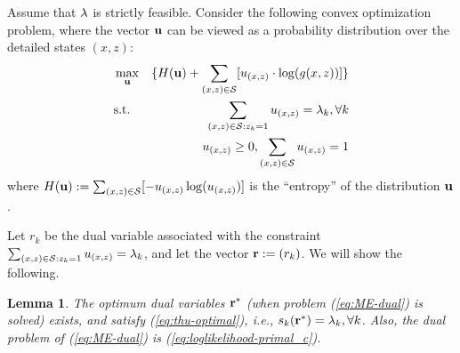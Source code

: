 \documentclass{IEEEtran}
\newtheorem{lemma}{Lemma}
\begin{document}
Assume that ${\bf \lambda}$ is strictly feasible. Consider the following
convex optimization problem, where the vector ${\bf u}$ can be viewed
as a probability distribution over the detailed states $(x,z)$:\begin{eqnarray}
 & \max_{{\bf u}} & \{H({\bf u})+\sum_{(x,z)\in{\cal S}}[u_{(x,z)}\cdot\log(g(x,z))]\}\nonumber \\
 & \text{s.t.} & \sum_{(x,z)\in{\cal S}:z_{k}=1}u_{(x,z)}=\lambda_{k},\forall k\nonumber \\
 &  & u_{(x,z)}\ge0,\sum_{(x,z)\in{\cal S}}u_{(x,z)}=1\label{eq:ME-dual}\end{eqnarray}
where $H({\bf u}):=\sum_{(x,z)\in{\cal S}}[-u_{(x,z)}\log(u_{(x,z)})]$
is the {}``entropy'' of the distribution ${\bf u}$.

Let $r_{k}$ be the dual variable associated with the constraint $\sum_{(x,z)\in{\cal S}:z_{k}=1}u_{(x,z)}=\lambda_{k}$,
and let the vector ${\bf r}:=(r_{k})$. We will show the following. 
\begin{lemma}
The optimum dual variables ${\bf r}^{*}$ (when problem (\ref{eq:ME-dual})
is solved) exists, and satisfy (\ref{eq:thu-optimal}), i.e., $s_{k}({\bf r}^{*})=\lambda_{k},\forall k$.
Also, the dual problem of (\ref{eq:ME-dual}) is (\ref{eq:loglikelihood-primal_c}).\end{lemma}
\end{document}
